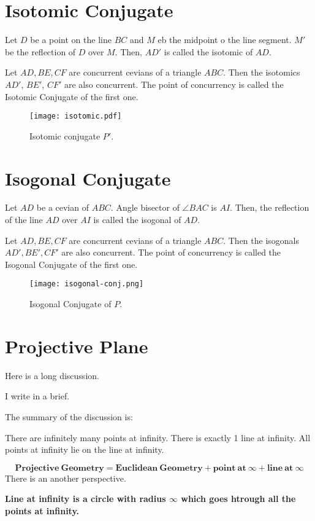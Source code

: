 \section{Isotomic Conjugate}
Let $D$ be a point on the line $BC$ and $M$ eb the midpoint o the line segment. $M'$ be the reflection of $D$ over $M$. Then, $AD'$ is called the isotomic of $AD$. 


\begin{theorem}
Let $AD,BE,CF$ are concurrent cevians of a triangle $ABC$. Then the isotomics $AD'$, $BE'$, $CF'$ are also concurrent. The point of concurrency is called the Isotomic Conjugate of the first one.
\end{theorem}

\begin{figure}[ht]
\centering
	\texttt{[image: isotomic.pdf]}
	\caption{Isotomic conjugate $P'$.}
\end{figure}

\section{Isogonal Conjugate}
Let $AD$ be a cevian of $ABC$. Angle bisector of $\angle BAC$ is $AI$. Then, the reflection of the line $AD$ over $AI$ is called the isogonal of $AD$.
\begin{theorem}
Let $AD,BE,CF$ are concurrent cevians of a triangle $ABC$. Then the isogonals $AD',BE',CF'$ are also concurrent. The point of concurrency is called the Isogonal Conjugate of the first one.
\end{theorem}
\begin{figure}[ht]
\centering
	\texttt{[image: isogonal-conj.png]}
	\caption{Isogonal Conjugate of $P$.}
\end{figure}
\section{Projective Plane}
Here is a long discussion.

I write in a brief.

The summary of the discussion is:
\begin{enumerate}
	\ii There are infinitely many points at infinity.
	\ii There is exactly 1 line at infinity.
	\ii All points at infinity lie on the line at infinity.
\end{enumerate}
\[\mathbf{Projective \ Geometry = Euclidean \ Geometry + point \ at \ \infty + line \ at \ \infty }\]
There is an another perspective.

\textbf{Line at infinity is a circle with radius $\infty$ which goes htrough all the points at infinity.}